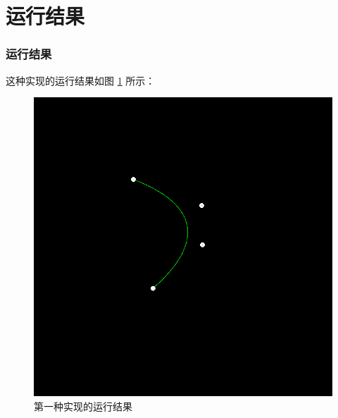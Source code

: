 \documentclass{ctexbeamer}
\begin{document}
    \section{运行结果}
    \begin{frame}
        \frametitle{运行结果}
    
        这种实现的运行结果如图 \ref{fig:res-1} 所示：

        \begin{figure}
            \centering
            \includegraphics[height=0.6\textheight]{pics/bezier_curve_1.png}
            \caption{第一种实现的运行结果}
            \label{fig:res-1}
        \end{figure}
    
    \end{frame}
\end{document}
